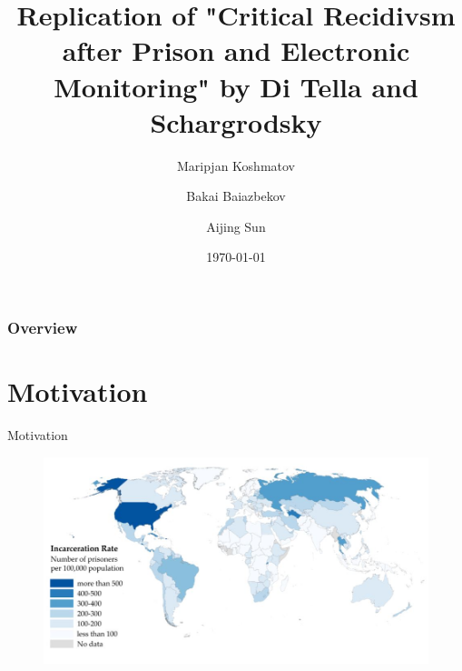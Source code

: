 \documentclass{beamer}
\title[Short title]{Replication of "Critical Recidivsm after Prison and Electronic Monitoring" by Di Tella and Schargrodsky} %
\author{Maripjan Koshmatov \and Bakai Baiazbekov \and Aijing Sun} %
\institute[LMU Munich] %
{
University of Munich \\ %
\medskip
}
\date{\today} %
\begin{document}
\begin{frame}
\titlepage %
\end{frame}

\begin{frame}
\frametitle{Overview} %
\tableofcontents %
\end{frame}

\section{Motivation}
\begin{frame}{Motivation}
\begin{figure}        
\centering
\includegraphics[width=\textwidth]{prison}
\end{figure}
 \end{frame}
\end{document}
